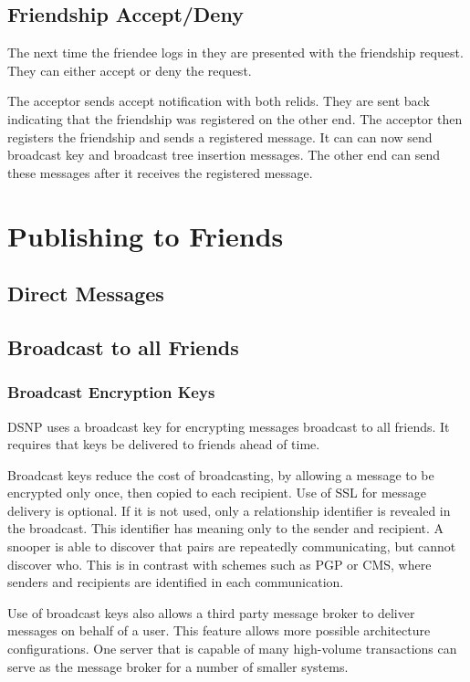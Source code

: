 \documentclass[letterpaper,11pt,oneside]{article}
\begin{document}
\subsection{Friendship Accept/Deny}

The next time the friendee logs in they are presented with the friendship
request. They can either accept or deny the request. 

The acceptor sends accept notification with both relids. They are sent back
indicating that the friendship was registered on the other end. The acceptor
then registers the friendship and sends a registered message. It can can now
send broadcast key and broadcast tree insertion messages. The other end can
send these messages after it receives the registered message.

\section{Publishing to Friends}

\subsection{Direct Messages}

\subsection{Broadcast to all Friends}

\subsubsection{Broadcast Encryption Keys}

DSNP uses a broadcast key for encrypting messages broadcast to all friends.
It requires that keys be delivered to friends ahead of time.

Broadcast keys reduce the cost of broadcasting, by allowing a message to be
encrypted only once, then copied to each recipient. Use of SSL for message
delivery is optional. If it is not used, only a relationship identifier is
revealed in the broadcast. This identifier has meaning only to the sender and
recipient. A snooper is able to discover that pairs are repeatedly
communicating, but cannot discover who. This is in contrast with schemes such
as PGP or CMS, where senders and recipients are identified in each
communication.

Use of broadcast keys also allows a third party message broker to deliver
messages on behalf of a user. This feature allows more possible architecture
configurations. One server that is capable of many high-volume transactions can
serve as the message broker for a number of smaller systems.
\end{document}
